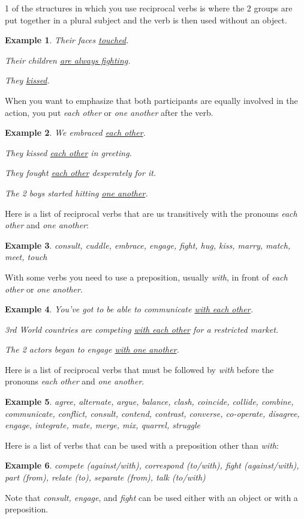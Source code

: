 \documentclass[oneside]{book}
\numberwithin{equation}{section}
\newtheorem{example}{Example}[section]
\begin{document}
%
\noindent{} 1 of the structures in which you use reciprocal verbs is where the 2 groups are put together in a plural subject and the verb is then used without an object.
\begin{example}
    Their faces \underline{touched}.
    
    Their children \underline{are always fighting}.
    
    They \underline{kissed}.
\end{example}
%
\noindent{} When you want to emphasize that both participants are equally involved in the action, you put \textit{each other} or \textit{one another} after the verb.
\begin{example}
    We embraced \underline{each other}.
    
    They kissed \underline{each other} in greeting.
    
    They fought \underline{each other} desperately for it.
    
    The 2 boys started hitting \underline{one another}.
\end{example}
Here is a list of reciprocal verbs that are us transitively with the pronouns \textit{each other} and \textit{one another}:
\begin{example}
    consult, cuddle, embrace, engage, fight, hug, kiss, marry, match, meet, touch
\end{example}
With some verbs you need to use a preposition, usually \textit{with}, in front of \textit{each other} or \textit{one another}.
\begin{example}
    You've got to be able to communicate \underline{with each other}.
    
    3rd World countries are competing \underline{with each other} for a restricted market.
    
    The 2 actors began to engage \underline{with one another}.
\end{example}
Here is a list of reciprocal verbs that must be followed by \textit{with} before the pronouns \textit{each other} and \textit{one another}.
\begin{example}
    agree, alternate, argue, balance, clash, coincide, collide, combine, communicate, conflict, consult, contend, contrast, converse, co-operate, disagree, engage, integrate, mate, merge, mix, quarrel, struggle
\end{example}
Here is a list of verbs that can be used with a preposition other than \textit{with}:
\begin{example}
    compete (against/with), correspond (to/with), fight (against/with), part (from), relate (to), separate (from), talk (to/with)
\end{example}
Note that \textit{consult, engage}, and \textit{fight} can be used either with an object or with a preposition.
\end{document}
